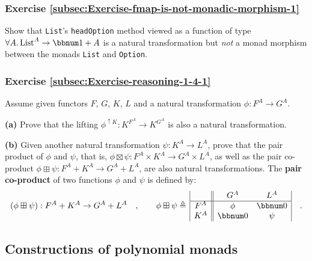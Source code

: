 \subsubsection{Exercise \label{subsec:Exercise-fmap-is-not-monadic-morphism-1}\ref{subsec:Exercise-fmap-is-not-monadic-morphism-1}}

Show that \lstinline!List!\textsf{'}s \lstinline!headOption! method viewed
as a function of type $\forall A.\,\text{List}^{A}\rightarrow\bbnum 1+A$
is a natural transformation but \emph{not} a monad morphism between
the monads \lstinline!List! and \lstinline!Option!.

\subsubsection{Exercise \label{subsec:Exercise-reasoning-1-4-1}\ref{subsec:Exercise-reasoning-1-4-1}}

Assume given functors $F$, $G$, $K$, $L$ and a natural transformation
$\phi:F^{A}\rightarrow G^{A}$.

\textbf{(a)} Prove that the lifting $\phi^{\uparrow K}:K^{F^{A}}\rightarrow K^{G^{A}}$
is also a natural transformation.

\textbf{(b)} Given another natural transformation $\psi:K^{A}\rightarrow L^{A}$,
prove that the pair product of $\phi$ and $\psi$, that is, $\phi\boxtimes\psi:F^{A}\times K^{A}\rightarrow G^{A}\times L^{A}$,
as well as the pair co-product $\phi\boxplus\psi:F^{A}+K^{A}\rightarrow G^{A}+L^{A}$,
are also natural transformations.
The \textbf{pair co-product}
of two functions $\phi$ and $\psi$ is defined by:
\[
(\phi\boxplus\psi):F^{A}+K^{A}\rightarrow G^{A}+L^{A}\quad,\quad\quad\phi\boxplus\psi\triangleq\,\begin{array}{|c||cc|}
 & G^{A} & L^{A}\\
\hline F^{A} & \phi & \bbnum 0\\
K^{A} & \bbnum 0 & \psi
\end{array}\quad.
\]


\subsection{Constructions of polynomial monads\label{subsec:Constructions-of-polynomial-monads}}

